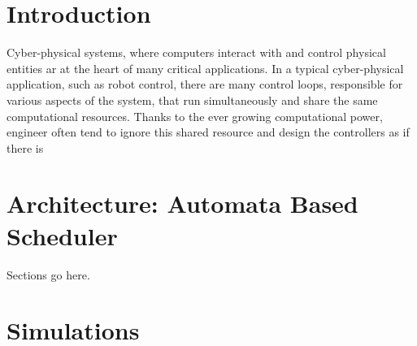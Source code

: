 \documentclass{sig-alternate-ipsn13}
\begin{document}
\section{Introduction}

Cyber-physical systems, where computers interact with and control physical entities ar at the heart of many critical applications. In a typical cyber-physical application, such as robot control, there are many control loops, responsible for various aspects of the system, that run simultaneously and share the same computational resources. Thanks to the ever growing computational power, engineer often tend to ignore this shared resource and design the controllers as if there is 


\section{Architecture: Automata Based Scheduler}

Sections go here.

\section{Simulations}
\label{sec:simulation}
\end{document}
